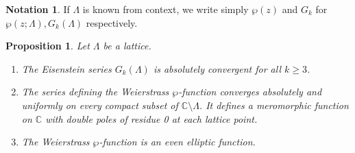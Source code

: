 \documentclass{article}
\newtheorem{proposition}[theorem]{Proposition}
\theoremstyle{definition}
\newtheorem*{notation}{Notation}
\theoremstyle{remark}
\newcommand{\C}{\mathbb{C}}
\begin{document}
\begin{notation}
	If $\Lambda$ is known from context, we write simply
	$\wp(z)$ and $G_k$ for $\wp(z; \Lambda), G_k(\Lambda)$
	respectively.
\end{notation}

\begin{proposition}
	Let $\Lambda$ be a lattice.
	\begin{enumerate}[label=(\alph*)]
		\item	The Eisenstein series $G_k(\Lambda)$ is absolutely convergent
			for all $k \geq 3$.
		\item The series defining the Weierstrass $\wp$-function converges
			absolutely and uniformly on every compact subset of
			$\C\setminus\Lambda$. It defines a meromorphic function on $\C$ with 
			double poles of residue 0 at each lattice point.
		\item The Weierstrass $\wp$-function is an even elliptic function.
	\end{enumerate}
\end{proposition}
\end{document}
